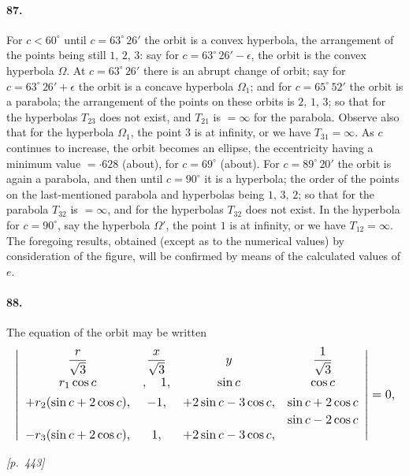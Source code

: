 \documentclass[11pt]{article}
\begin{document}
\paragraph{87.} For $c < 60^{\circ}$ until $c = 63^{\circ}\,26'$ the orbit is a convex hyperbola, the arrangement of the points being still $1,\, 2,\, 3$: say for $c = 63^{\circ}\,26' - \epsilon$, the orbit is the convex hyperbola $\Omega$. At $c = 63^{\circ}\,26'$ there is an abrupt change of orbit; say for $c = 63^{\circ}\,26' + \epsilon$ the orbit is a concave hyperbola $\Omega_{1}$; and for $c = 65^{\circ}\,52'$ the orbit is a parabola; the arrangement of the points on these orbits is $2,\, 1,\, 3$; so that for the hyperbolas $T_{23}$ does not exist, and $T_{21}$ is $= \infty$ for the parabola. Observe also that for the hyperbola $\Omega_{1}$, the point $3$ is at infinity, or we have $T_{31} = \infty$. As $c$ continues to increase, the orbit becomes an ellipse, the eccentricity having a minimum value $= {\cdot}628$ (about), for $c = 69^{\circ}$ (about). For $c = 89^{\circ}\,20'$ the orbit is again a parabola, and then until $c = 90^{\circ}$ it is a hyperbola; the order of the points on the last-mentioned parabola and hyperbolas being $1,\, 3,\, 2$; so that for the parabola $T_{32}$ is $= \infty$, and for the hyperbolas $T_{32}$ does not exist. In the hyperbola for $c = 90^{\circ}$, say the hyperbola $\Omega'$, the point $1$ is at infinity, or we have $T_{12} = \infty$. The foregoing results, obtained (except as to the numerical values) by consideration of the figure, will be confirmed by means of the calculated values of $e$.

\paragraph{88.} The equation of the orbit may be written
\[
\resizebox{\textwidth}{!}{$\displaystyle
\left|\begin{array}{cccc}
\dfrac{r}{\sqrt{3}} & \dfrac{x}{\sqrt{3}} & y & \dfrac{1}{\sqrt{3}}\\[6pt]
r_{1}\cos c & ,\quad 1, & \sin c & \cos c\\[4pt]
+r_{2}(\sin c + 2\cos c), & -1, & +2\sin c - 3\cos c, & \sin c + 2\cos c\\[2pt]
& & & \sin c - 2\cos c\\
-r_{3}(\sin c + 2\cos c), & 1, & +2\sin c - 3\cos c, & \\
\end{array}\right| = 0,
$}
\]

\medskip
\noindent\textit{[p.~443]}
\end{document}
